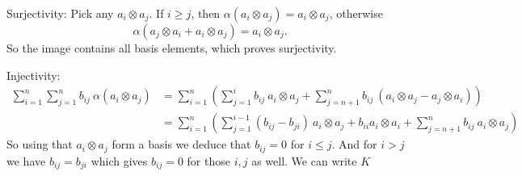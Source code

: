 \begin{exercise}{4}
\begin{enumerate}[i)]
            Surjectivity:
            Pick any $a_i \otimes a_j$. If $i \geq j$, then $\alpha(a_i \otimes
            a_j) = a_i \otimes a_j$, otherwise
            \begin{equation*}
                \alpha(a_j \otimes a_i + a_i \otimes a_j) = a_i \otimes a_j.
            \end{equation*}
            So the image contains all basis elements, which proves surjectivity.

            Injectivity:
            \begin{align*}
                \sum^n_{i=1} \sum^n_{j=1} b_{ij}\ \alpha(a_i \otimes a_j) &=
                \sum^n_{i=1} \left(\sum^i_{j=1} b_{ij}\ a_i \otimes a_j +
                \sum^n_{j=n+1} b_{ij}\ ( a_i \otimes a_j - a_j \otimes a_i
                )\right) \\
                &= \sum^n_{i=1} \left(\sum^{i - 1}_{j=1} (b_{ij} - b_{ji})\ a_i
                \otimes a_j + b_{ii} a_i \otimes a_i + \sum^n_{j=n+1} b_{ij}\
                a_i \otimes a_j \right)
            \end{align*}
            So using that $a_i \otimes a_j$ form a basis we deduce that $b_{ij}
            = 0$ for $i \leq j$. And for $i > j$ we have $b_{ij} = b_{ji}$ which
            gives $b_{ij} = 0$ for those $i, j$ as well.
            We can write $K$ 


    \end{enumerate}
\end{exercise}


